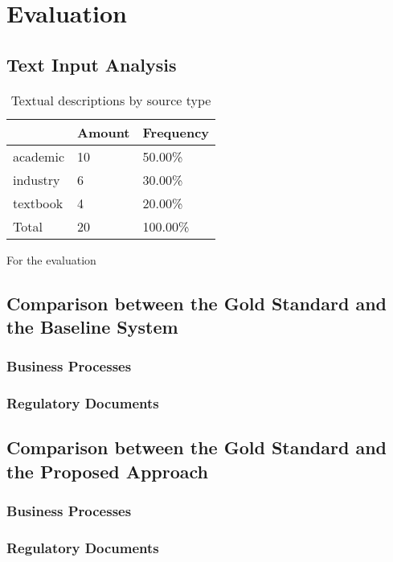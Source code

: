 \chapter{Evaluation}
\label{sec:evaluation}
\section{Text Input Analysis}
\begin{table}[]
\begin{center}
\caption{\centering Textual descriptions by source type}
\label{table:source_type}
\begin{tabular}{l|l|l}
         & Amount & Frequency \\ \hline
academic & 10     & 50.00\%   \\
industry & 6      & 30.00\%   \\
textbook & 4      & 20.00\%   \\ \hline
Total    & 20     & 100.00\% 
\end{tabular}
\end{center}
\end{table}


For the evaluation 

\section{Comparison between the Gold Standard and the Baseline System}
\subsection{Business Processes}

\subsection{Regulatory Documents}


\section{Comparison between the Gold Standard and the Proposed Approach}
\subsection{Business Processes}

\subsection{Regulatory Documents}

\newpage